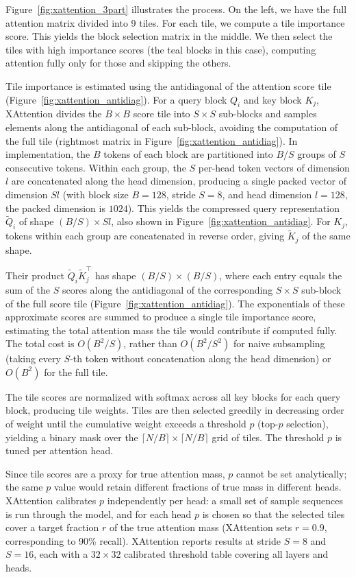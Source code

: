 Figure~\ref{fig:xattention_3part} illustrates the process. On the left, we have the full attention matrix divided into 9 tiles. For each tile, we compute a tile importance score. This yields the block selection matrix in the middle. We then select the tiles with high importance scores (the teal blocks in this case), computing attention fully only for those and skipping the others.

Tile importance is estimated using the antidiagonal of the attention score tile (Figure~\ref{fig:xattention_antidiag}). For a query block $Q_i$ and key block $K_j$, XAttention divides the $B \times B$ score tile into $S \times S$ sub-blocks and samples elements along the antidiagonal of each sub-block, avoiding the computation of the full tile (rightmost matrix in Figure~\ref{fig:xattention_antidiag}). In implementation, the $B$ tokens of each block are partitioned into $B/S$ groups of $S$ consecutive tokens. Within each group, the $S$ per-head token vectors of dimension $l$ are concatenated along the head dimension, producing a single packed vector of dimension $Sl$ (with block size $B=128$, stride $S=8$, and head dimension $l=128$, the packed dimension is $1024$). This yields the compressed query representation $\tilde{Q}_i$ of shape $(B/S) \times Sl$, also shown in Figure~\ref{fig:xattention_antidiag}. For $K_j$, tokens within each group are concatenated in reverse order, giving $\tilde{K}_j$ of the same shape.

Their product $\tilde{Q}_i \tilde{K}_j^\top$ has shape $(B/S) \times (B/S)$, where each entry equals the sum of the $S$ scores along the antidiagonal of the corresponding $S \times S$ sub-block of the full score tile (Figure~\ref{fig:xattention_antidiag}). The exponentials of these approximate scores are summed to produce a single tile importance score, estimating the total attention mass the tile would contribute if computed fully. The total cost is $O(B^2/S)$, rather than $O(B^2/S^2)$ for naive subsampling (taking every $S$-th token without concatenation along the head dimension) or $O(B^2)$ for the full tile.



The tile scores are normalized with softmax across all key blocks for each query block, producing tile weights. Tiles are then selected greedily in decreasing order of weight until the cumulative weight exceeds a threshold $p$ (top-$p$ selection), yielding a binary mask over the $\lceil N/B \rceil \times \lceil N/B \rceil$ grid of tiles. The threshold $p$ is tuned per attention head.

Since tile scores are a proxy for true attention mass, $p$ cannot be set analytically; the same $p$ value would retain different fractions of true mass in different heads. XAttention calibrates $p$ independently per head: a small set of sample sequences is run through the model, and for each head $p$ is chosen so that the selected tiles cover a target fraction $r$ of the true attention mass (XAttention sets $r=0.9$, corresponding to 90\% recall). XAttention reports results at stride $S=8$ and $S=16$, each with a $32 \times 32$ calibrated threshold table covering all layers and heads.






